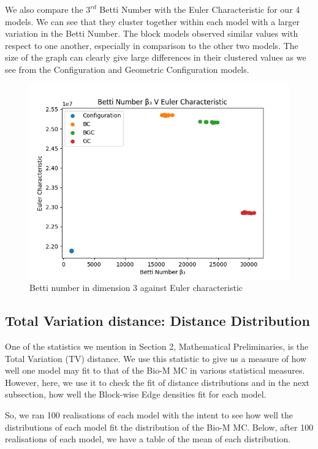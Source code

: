 We also compare the $3^{rd}$ Betti Number with the Euler Characteristic for our 4 models. We can see that they cluster together within each model with a larger variation in the Betti Number. The block models observed similar values with respect to one another, especially in comparison to the other two models. The size of the graph can clearly give large differences in their clustered values as we see from the Configuration and Geometric Configuration models. 

\begin{figure}[H]
\begin{center}
\captionsetup{justification=centering}
\includegraphics[width=12cm]{graph/bVe.png}
\caption{Betti number in dimension 3 against Euler characteristic}
\end{center}
\end{figure}

\subsection{Total Variation distance: Distance Distribution}
One of the statistics we mention in Section 2, Mathematical Preliminaries, is the Total Variation (TV) distance. We use this statistic to give us a measure of how well one model may fit to that of the Bio-M MC in various statistical measures. However, here, we use it to check the fit of distance distributions and in the next subsection, how well the Block-wise Edge densities fit for each model.

So, we ran 100 realisations of each model with the intent to see how well the distributions of each model fit the distribution of the Bio-M MC. Below, after 100 realisations of each model, we have a table of the mean of each distribution. 

